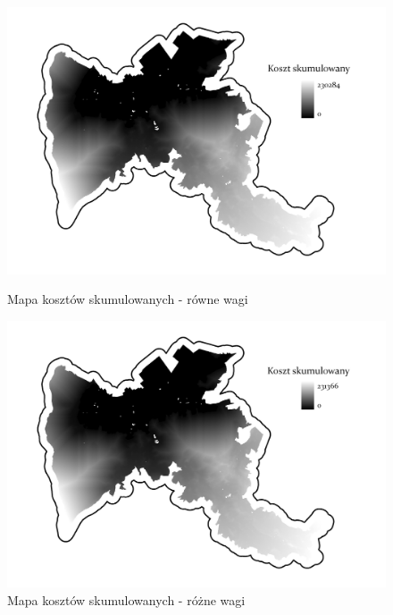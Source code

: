 \documentclass{article}
\begin{document}
\begin{figure}[H]
    \begin{minipage}[t]{0.48\textwidth}
        \centering
        \includegraphics[width=\linewidth]{img/cost-distance.jpg}
        \caption{Mapa kosztów skumulowanych - równe wagi}
        \label{fig:cost-distance-rowne}
    \end{minipage}
    \hfill
    \begin{minipage}[t]{0.48\textwidth}
        \centering
        \includegraphics[width=\linewidth]{img/roznewagi-cost-distance.jpg}
        \caption{Mapa kosztów skumulowanych - różne wagi}
        \label{fig:cost-distance-rozne}
    \end{minipage}
\end{figure}
\vspace{10pt}
\end{document}
